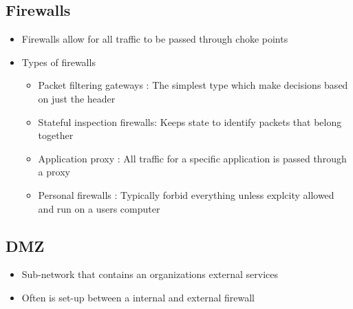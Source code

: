 \documentclass[twoside]{article}
\begin{document}
\subsection{Firewalls}
\begin{itemize}
\item Firewalls allow for all traffic to be passed through choke points
\item Types of firewalls
\begin{itemize}
\item Packet filtering gateways : The simplest type which make decisions based on just the header
\item Stateful inspection firewalls: Keeps state to identify packets that belong together
\item Application proxy : All traffic for a specific application is passed through a proxy
\item Personal firewalls : Typically forbid everything unless explcity allowed and run on a users computer
\end{itemize}
\end{itemize}

\subsection{DMZ}
\begin{itemize}
\item Sub-network that contains an organizations external services
\item Often is set-up between a internal and external firewall
\end{itemize}
\end{document}
